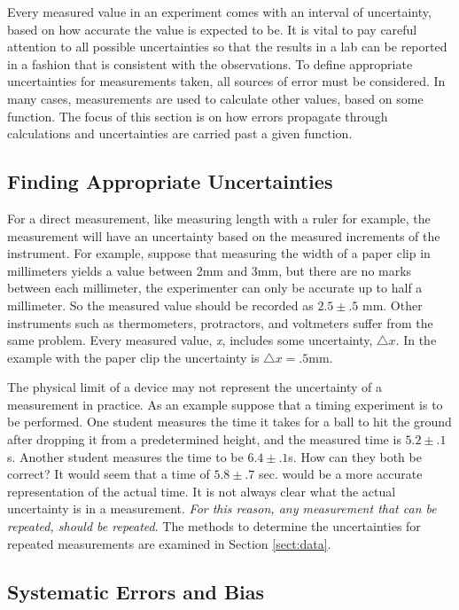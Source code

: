 \documentclass[12pt]{article}
\begin{document}
Every measured value in an experiment comes with an interval of
uncertainty, based on how accurate the value is expected to be.  It is
vital to pay careful attention to all possible uncertainties so that
the results in a lab can be reported in a fashion that is consistent
with the observations.  To define appropriate uncertainties for
measurements taken, all sources of error must be considered.  In many
cases, measurements are used to calculate other values, based on some
function.  The focus of this section is on how errors propagate
through calculations and uncertainties are carried past a given
function.

\subsection{Finding Appropriate Uncertainties}

For a direct measurement, like measuring length with a ruler for
example, the measurement will have an uncertainty based on the
measured increments of the instrument.  For example, suppose that
measuring the width of a paper clip in millimeters yields a value
between 2mm and 3mm, but there are no marks between each millimeter,
the experimenter can only be accurate up to half a millimeter.  So the
measured value should be recorded as $2.5\pm .5$ mm.  Other
instruments such as thermometers, protractors, and voltmeters suffer
from the same problem.  Every measured value, \textit{x}, includes
some uncertainty, $\triangle{x}$.  In the example with the paper clip
the uncertainty is $\triangle{x} = .5$mm.

The physical limit of a device may not represent the uncertainty of a
measurement in practice. As an example suppose that a timing
experiment is to be performed.  One student measures the time it takes
for a ball to hit the ground after dropping it from a predetermined
height, and the measured time is $5.2 \pm .1$s.  Another student
measures the time to be $6.4 \pm .1$s.  How can they both be correct?
It would seem that a time of $5.8 \pm .7$ sec.  would be a more
accurate representation of the actual time.  It is not always clear
what the actual uncertainty is in a measurement. \textit{For this
  reason, any measurement that can be repeated, should be repeated}.
The methods to determine the uncertainties for repeated measurements
are examined in Section \ref{sect:data}.


\subsection{Systematic Errors and Bias}
\end{document}
